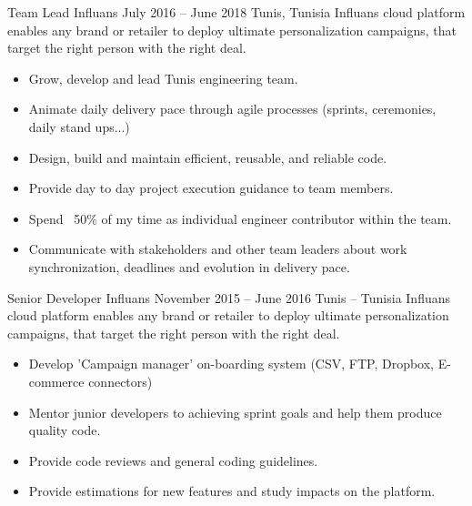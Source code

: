 \documentclass[10pt,a4paper]{resume-settings}
\begin{document}
\cvevent
    {Team Lead}
    {Influans}
    {July 2016 -- June 2018}
    {Tunis, Tunisia}
    {Influans cloud platform enables any brand or retailer to deploy ultimate personalization campaigns, that target the right person with the right deal.}
    \begin{itemize}
        \item Grow, develop and lead Tunis engineering team.
        \item Animate daily delivery pace through agile processes (sprints, ceremonies, daily stand ups...)
        \item Design, build and maintain efficient, reusable, and reliable code.
        \item Provide day to day project execution guidance to team members.
        \item Spend ~50\% of my time as individual engineer contributor within the team.
        \item Communicate with stakeholders and other team leaders about work synchronization, deadlines and evolution in delivery pace.
    \end{itemize}

\divider

\cvevent
    {Senior Developer}
    {Influans}
    {November 2015 --  June 2016}
    {Tunis -- Tunisia}
    {Influans cloud platform enables any brand or retailer to deploy ultimate personalization campaigns, that target the right person with the right deal.}
    \begin{itemize}
        \item Develop 'Campaign manager' on-boarding system (CSV, FTP, Dropbox, E-commerce connectors)
        \item Mentor junior developers to achieving sprint goals and help them produce quality code.
        \item Provide code reviews and general coding guidelines.
        \item Provide estimations for new features and study impacts on the platform.
    \end{itemize}
\divider
\end{document}
